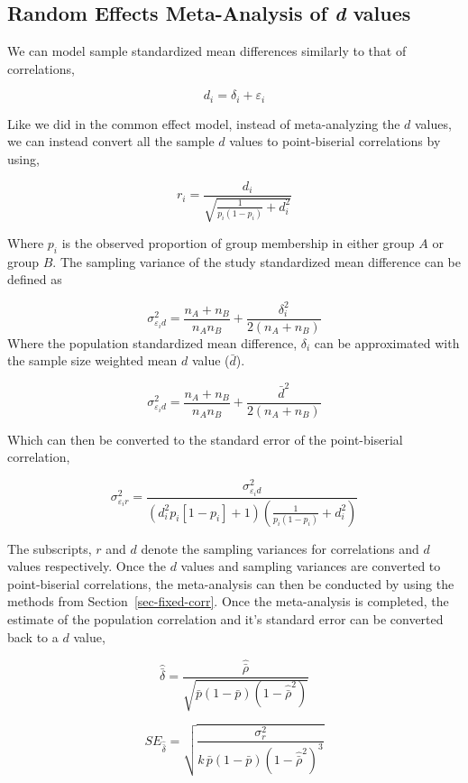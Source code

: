 \documentclass[
  letterpaper,
  DIV=11,
  numbers=noendperiod]{scrreprt}
\begin{document}
\hypertarget{sec-random-d}{%
\subsection{\texorpdfstring{Random Effects Meta-Analysis of \emph{d}
values}{Random Effects Meta-Analysis of d values}}\label{sec-random-d}}

We can model sample standardized mean differences similarly to that of
correlations,

\[
d_i = \delta_i + \varepsilon_i
\]

Like we did in the common effect model, instead of meta-analyzing the
\(d\) values, we can instead convert all the sample \(d\) values to
point-biserial correlations by using,

\[
r_i = \frac{d_i}{\sqrt{\frac{1}{p_i(1-p_i)}+d_i^2}}
\]

Where \(p_i\) is the observed proportion of group membership in either
group \(A\) or group \(B\). The sampling variance of the study
standardized mean difference can be defined as

\[
\sigma^2_{\varepsilon_id} = \frac{n_A+n_B}{n_A n_B} + \frac{\delta_i^2}{2(n_A+n_B)}
\] Where the population standardized mean difference, \(\delta_i\) can
be approximated with the sample size weighted mean \(d\) value
(\(\bar{d}\)).

\[
\sigma^2_{\varepsilon_id} = \frac{n_A+n_B}{n_A n_B} + \frac{\bar{d}^2}{2(n_A+n_B)}
\]

Which can then be converted to the standard error of the point-biserial
correlation,

\[
\sigma^2_{\varepsilon_ir} =\frac{\sigma_{\varepsilon_id}^2}{\left(d_i^2p_i[1-p_i]+1\right)\left(\frac{1}{p_i(1-p_i)}+d_i^2\right)}
\]

The subscripts, \(r\) and \(d\) denote the sampling variances for
correlations and \(d\) values respectively. Once the \(d\) values and
sampling variances are converted to point-biserial correlations, the
meta-analysis can then be conducted by using the methods from
Section~\ref{sec-fixed-corr}. Once the meta-analysis is completed, the
estimate of the population correlation and it's standard error can be
converted back to a \(d\) value,

\[
\hat{\bar{\delta}} = \frac{\hat{\bar{\rho}}}{\sqrt{\bar{p}(1-\bar{p})(1-\hat{\bar{\rho}}^2)}}
\]

\[
SE_{\hat{\bar{\delta}}}= \sqrt{\frac{\sigma_r^2}{k\, \bar{p}\left(1-\bar{p}\right)\left(1-\hat{\bar{\rho}}^2\right)^3}}
\]
\end{document}
